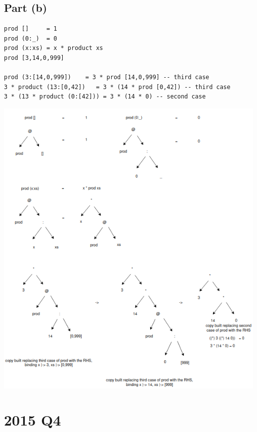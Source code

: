 \documentclass[11pt]{article}
\begin{document}
\subsection{Part (b)}
\label{sec:orgc6af4e8}
\begin{verbatim}
prod []     = 1
prod (0:_)  = 0
prod (x:xs) = x * product xs
prod [3,14,0,999]

prod (3:[14,0,999])    = 3 * prod [14,0,999] -- third case
3 * product (13:[0,42])   = 3 * (14 * prod [0,42]) -- third case
3 * (13 * product (0:[42])) = 3 * (14 * 0) -- second case
\end{verbatim}
\begin{center}
\includegraphics[width=155mm]{./prod-xs.png}
\end{center}
\section{2015 Q4}
\label{sec:orge060f8f}
\end{document}
